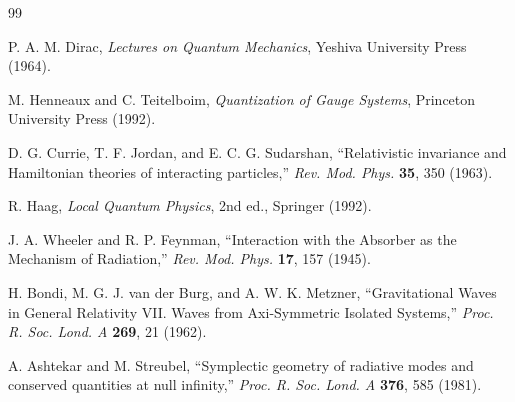 \documentclass[11pt]{article}
\begin{document}
\begin{thebibliography}{99}

P. A. M. Dirac, \textit{Lectures on Quantum Mechanics}, Yeshiva University Press (1964).

M. Henneaux and C. Teitelboim, \textit{Quantization of Gauge Systems}, Princeton University Press (1992).

D. G. Currie, T. F. Jordan, and E. C. G. Sudarshan, ``Relativistic invariance and Hamiltonian theories of interacting particles,'' \textit{Rev. Mod. Phys.} \textbf{35}, 350 (1963).

R. Haag, \textit{Local Quantum Physics}, 2nd ed., Springer (1992).

J. A. Wheeler and R. P. Feynman, ``Interaction with the Absorber as the Mechanism of Radiation,'' \textit{Rev. Mod. Phys.} \textbf{17}, 157 (1945).

H. Bondi, M. G. J. van der Burg, and A. W. K. Metzner, ``Gravitational Waves in General Relativity VII. Waves from Axi-Symmetric Isolated Systems,'' \textit{Proc. R. Soc. Lond. A} \textbf{269}, 21 (1962).

A. Ashtekar and M. Streubel, ``Symplectic geometry of radiative modes and conserved quantities at null infinity,'' \textit{Proc. R. Soc. Lond. A} \textbf{376}, 585 (1981).

\end{thebibliography}
\end{document}
